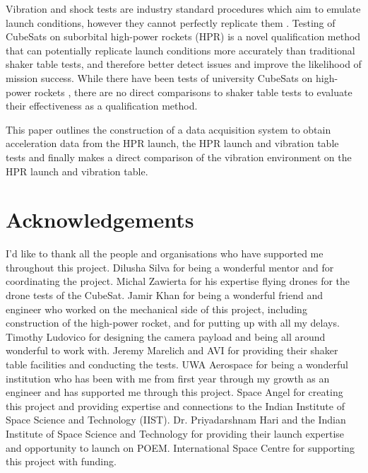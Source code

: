 \documentclass[a4paper,11pt]{article}
\begin{document}
Vibration and shock tests are industry standard procedures which aim to emulate launch conditions, however they cannot perfectly replicate them \cite{gordon2015benefits}. Testing of CubeSats on suborbital high-power rockets (HPR) is a novel qualification method that can potentially replicate launch conditions more accurately than traditional shaker table tests, and therefore better detect issues and improve the likelihood of mission success. While there have been tests of university CubeSats on high-power rockets \cite{slongo2019pre}, there are no direct comparisons to shaker table tests to evaluate their effectiveness as a qualification method.

This paper outlines the construction of a data acquisition system to obtain acceleration data from the HPR launch, the HPR launch and vibration table tests and finally makes a direct comparison of the vibration environment on the HPR launch and vibration table.


\section{Acknowledgements}

I'd like to thank all the people and organisations who have supported me throughout this project. Dilusha Silva for being a wonderful mentor and for coordinating the project. Michal Zawierta for his expertise flying drones for the drone tests of the CubeSat. Jamir Khan for being a wonderful friend and engineer who worked on the mechanical side of this project, including construction of the high-power rocket, and for putting up with all my delays. Timothy Ludovico for designing the camera payload and being all around wonderful to work with. Jeremy Marelich and AVI for providing their shaker table facilities and conducting the tests. UWA Aerospace for being a wonderful institution who has been with me from first year through my growth as an engineer and has supported me through this project. Space Angel for creating this project and providing expertise and connections to the Indian Institute of Space Science and Technology (IIST). Dr. Priyadarshnam Hari and the Indian Institute of Space Science and Technology for providing their launch expertise and opportunity to launch on POEM. International Space Centre for supporting this project with funding.


\newpage
\tableofcontents
\newpage

\end{document}
